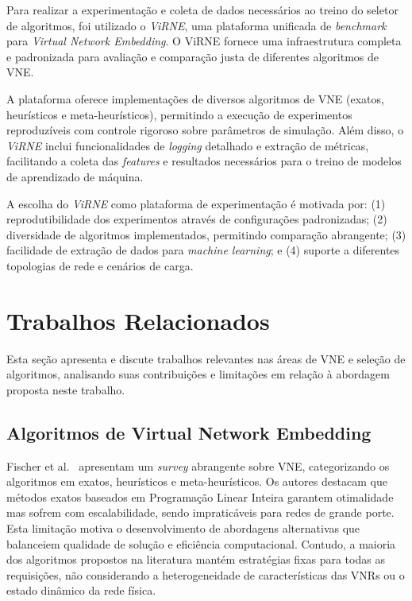 \documentclass[conference]{IEEEtran}
\begin{document}
Para realizar a experimentação e coleta de dados necessários ao treino do seletor de algoritmos, foi utilizado o \textit{ViRNE}\cite{virne}, uma plataforma unificada de \textit{benchmark} para \textit{Virtual Network Embedding}.
O ViRNE fornece uma infraestrutura completa e padronizada para avaliação e comparação justa de diferentes algoritmos de VNE.

A plataforma oferece implementações de diversos algoritmos de VNE (exatos, heurísticos e meta-heurísticos), permitindo a execução de experimentos reproduzíveis com controle rigoroso sobre parâmetros de simulação.
Além disso, o \textit{ViRNE} inclui funcionalidades de \textit{logging} detalhado e extração de métricas, facilitando a coleta das \textit{features} e resultados necessários para o treino de modelos de aprendizado de máquina.

A escolha do \textit{ViRNE} como plataforma de experimentação é motivada por: (1) reprodutibilidade dos experimentos através de configurações padronizadas; (2) diversidade de algoritmos implementados, permitindo comparação abrangente; (3) facilidade de extração de dados para \textit{machine learning}; e (4) suporte a diferentes topologias de rede e cenários de carga.

\section{Trabalhos Relacionados}
\label{sec:RelatedWork}

Esta seção apresenta e discute trabalhos relevantes nas áreas de VNE e seleção de algoritmos, analisando suas contribuições e limitações em relação à abordagem proposta neste trabalho.

\subsection{Algoritmos de Virtual Network Embedding}

Fischer et al.~\cite{fischer2013vne-survey} apresentam um \textit{survey} abrangente sobre VNE, categorizando os algoritmos em exatos, heurísticos e meta-heurísticos. Os autores destacam que métodos exatos baseados em Programação Linear Inteira garantem otimalidade mas sofrem com escalabilidade, sendo impraticáveis para redes de grande porte. Esta limitação motiva o desenvolvimento de abordagens alternativas que balanceiem qualidade de solução e eficiência computacional. Contudo, a maioria dos algoritmos propostos na literatura mantém estratégias fixas para todas as requisições, não considerando a heterogeneidade de características das VNRs ou o estado dinâmico da rede física.
\end{document}
